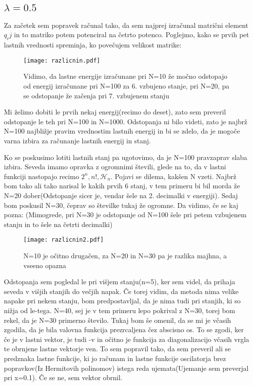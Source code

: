 \documentclass{article}
\begin{document}
\subsection{$\lambda=0.5$}
Za začetek sem popravek računal tako, da sem najprej izračunal matrični element $q_ij$ in to matriko potem potenciral na četrto potenco.
Poglejmo, kako se prvih pet lastnih vrednosti spreminja, ko povečujem velikost matrike:
\begin{figure}[H]
\texttt{[image: razlicnin.pdf]}
\caption*{Vidimo, da lastne energije izračunane pri N=10 že močno odstopajo od energij izračunane pri N=100 za 6. vzbujeno stanje, pri N=20, pa se odstopanje že začenja pri 7. vzbujenem stanju}
\end{figure}
Mi želimo dobiti le prvih nekaj energij(recimo do deset), zato sem preveril odstopanje le teh pri N=100 in N=1000. Odstopanja ni bilo videti, zato je najbrž N=100 najbližje pravim vrednostim lastnih energij in bi se zdelo, da je mogoče varna izbira za računanje lastnih energij in stanj.

Ko se poskusimo lotiti lastnih stanj pa ugotovimo, da je N=100 pravzaprav slaba izbira. Seveda imamo opravka z ogromnimi števili, glede na to, da v lastni funkciji nastopajo recimo $2^n, n!, \mathcal{H}_n$. Pojavi se dilema, kakšen N vzeti. Najbrž bom tako ali tako narisal le kakih prvih 6 stanj, v tem primeru bi bil morda že N=20 dober(Odstopanje sicer je, vendar šele na 2. decimalki v energiji). Sedaj bom poskusil N=30, čeprav so številke tukaj že ogromne. Da vidimo, če se kaj pozna:
(Mimogrede, pri N=30 je odstopanje od N=100 šele pri petem vzbujenem stanju in to šele na četrti decimalki)

\begin{figure}[H]
\texttt{[image: razlicnin2.pdf]}
\caption*{N=10 je očitno drugačen, za N=20 in N=30 pa je razlika majhna, a vseeno opazna}
\end{figure}

Odstopanja sem pogledal le pri višjem stanju(n=5), ker sem videl, da prihaja seveda v višjih stanjih do večjih napak. Če torej vidim, da metoda nima velike napake pri nekem stanju, bom predpostavljal, da je nima tudi pri stanjih, ki so nižja od le-tega. N=40, sej je v tem primeru lepo pokrival z N=30, torej bom rekel, da je N=30 primerno število. Tukaj bom še omenil, da se mi je včasih zgodila, da je bila valovna funkcija prezrcaljena čez abscisno os. To se zgodi, ker če je v lastni vektor, je tudi -v in očitno je funkcija za diagonalizacijo včasih vrgla te obrnjene lastne vektorje ven. To sem popravil tako, da sem preveril ali se predznaka lastne funkcije, ki jo računam in lastne funkcije oscilatorja brez popravkov(Iz Hermitovih polinomov) istega reda ujemata(Ujemanje sem preverjal pri x=0.1). Če se ne, sem vektor obrnil.
\end{document}
